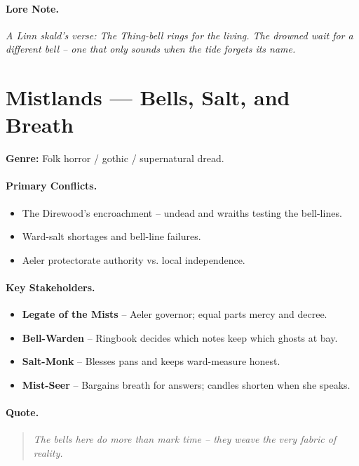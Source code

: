 \paragraph{Lore Note.}
\emph{\textquotedbl A Linn skald's verse: \textquotedbl The Thing-bell rings for the living. The drowned wait for a different bell -- one that only sounds when the tide forgets its name.\textquotedbl}

\section{Mistlands --- \textquotedbl Bells, Salt, and Breath\textquotedbl}
\textbf{Genre:} Folk horror / gothic / supernatural dread.

\paragraph{Primary Conflicts.}
\begin{itemize}
  \item The Direwood's encroachment -- undead and wraiths testing the bell-lines.
  \item Ward-salt shortages and bell-line failures.
  \item Aeler protectorate authority vs. local independence.
\end{itemize}

\paragraph{Key Stakeholders.}
\begin{itemize}
  \item \textbf{Legate of the Mists} -- Aeler governor; equal parts mercy and decree.
  \item \textbf{Bell-Warden} -- Ringbook decides which notes keep which ghosts at bay.
  \item \textbf{Salt-Monk} -- Blesses pans and keeps ward-measure honest.
  \item \textbf{Mist-Seer} -- Bargains breath for answers; candles shorten when she speaks.
\end{itemize}

\paragraph{Quote.}
\begin{quote}
\emph{\textquotedbl The bells here do more than mark time -- they weave the very fabric of reality.\textquotedbl}
\end{quote}

